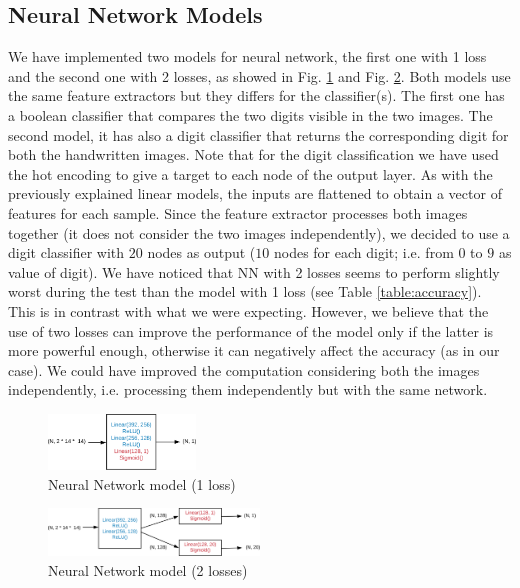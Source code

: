 \documentclass[journal, a4paper]{IEEEtran}
\begin{document}
\subsection{Neural Network Models}
\label{sec:nnmodel}
We have implemented two models for neural network, the first one with 1 loss and the second one with 2 losses, as showed in Fig. \ref{fig:nn1} and Fig. \ref{fig:nn2}. Both models use the same feature extractors but they differs for the classifier(s). The first one has a boolean classifier that compares the two digits visible in the two images. The second model, it has also a digit classifier that returns the corresponding digit for both the handwritten images. Note that for the digit classification we have used the hot encoding to give a target to each node of the output layer.
As with the previously explained linear models, the inputs are flattened to obtain a vector of features for each sample.
Since the feature extractor processes both images together (it does not consider the two images independently), we decided to use a digit classifier with $20$ nodes as output ($10$ nodes for each digit; i.e. from $0$ to $9$ as value of digit). We have noticed that NN with 2 losses seems to perform slightly worst during the test than the model with 1 loss (see Table \ref{table:accuracy}). This is in contrast with what we were expecting. However, we believe that the use of two losses can improve the performance of the model only if the latter is more powerful enough, otherwise it can negatively affect the accuracy (as in our case). We could have improved the computation considering both the images independently, i.e. processing them independently but with the same network.

\begin{figure}[!h]
    \centering
    \includegraphics[width=0.35\textwidth]{nn1.png}
    \caption{Neural Network model (1 loss)}
    \label{fig:nn1}
\end{figure}

\begin{figure}[!h]
    \centering
    \includegraphics[width=0.5\textwidth]{nn2.png}
    \caption{Neural Network model (2 losses)}
    \label{fig:nn2}
\end{figure}
\end{document}
